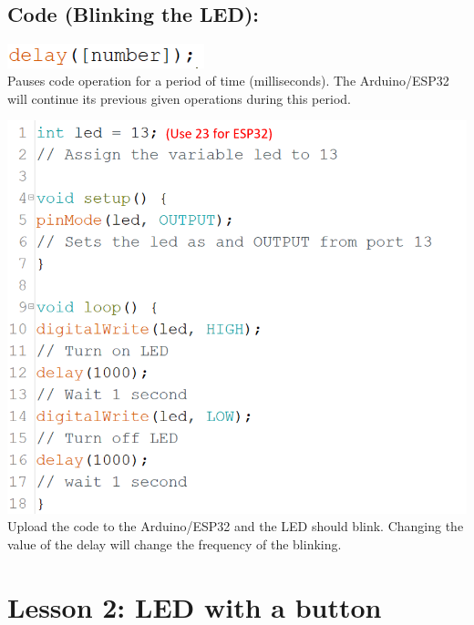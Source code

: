 \documentclass[a4paper,12pt]{report}
\newcommand{\diagramWidth}{150mm}
\newcommand{\codeHeight}{7mm}
\begin{document}
\newpage
\subsection*{Code (Blinking the LED):}
    \begin{mdframed}[linewidth = 3, linecolor = turbo_purple]
        \includegraphics[height = \codeHeight]{Assets/delay.png} \\
        Pauses code operation for a period of time (milliseconds). The Arduino/ESP32 will continue its previous given operations during this period.
    \end{mdframed}
    \vspace{10mm}
    \includegraphics[width = \diagramWidth]{Assets/blink_led.png} \\
    Upload the code to the Arduino/ESP32 and the LED should blink. Changing the value of the delay will change the frequency of the blinking.

\newpage
\section*{Lesson 2: LED with a button}
\end{document}
